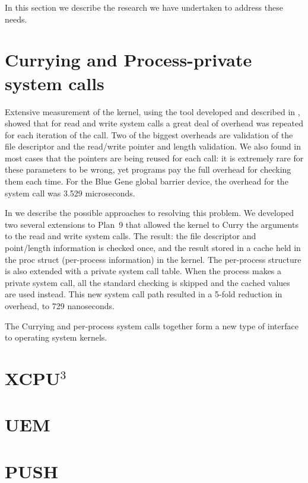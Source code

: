 In this section we describe the research we have undertaken to address these needs. 

\section{Currying and Process-private system calls}
Extensive measurement of the kernel, using the tool developed and described in \cite{plan9trace}, showed
that for read and write system calls a great deal of overhead was repeated for each iteration of the 
call. Two of the biggest overheads are validation of the file descriptor and the read/write pointer and 
length validation. We also found in most cases that the pointers are being reused for each call: it is extremely rare for these parameters to be wrong, yet programs pay the full overhead for checking them 
each time. For the Blue Gene global barrier device, the overhead for the system call was 3.529 microseconds. 

In \cite{currying} we describe the possible approaches to resolving this problem. We developed two 
several extensions to Plan~9 that allowed the kernel to Curry the arguments to the read and write
system calls. The result: the file descriptor and point/length information is checked once, and the
result stored in a cache held in the proc struct (per-process information) in the kernel. The per-process structure is 
also extended with a private system call table. When the process makes a private system
call, all the standard checking is skipped and the cached values are used instead. This 
new system call path resulted in a 5-fold reduction in overhead, to 729 nanoseconds. 

The Currying and per-process system calls together form a new type of interface to operating system
kernels. 


\section{XCPU$^3$}
\section{UEM}
\section{PUSH}
